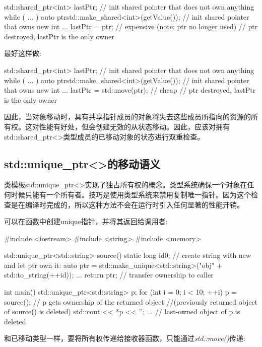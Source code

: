 \begin{cppcode}
std::shared_ptr<int> lastPtr; // init shared pointer that does not own anything
while ( ... ) {
	auto ptr{std::make_shared<int>(getValue())}; // init shared pointer that owns new int
	...
	lastPtr = ptr; // expensive (note: ptr no longer used)
} // ptr destroyed, lastPtr is the only owner
\end{cppcode}

最好这样做:

\begin{cppcode}
std::shared_ptr<int> lastPtr; // init shared pointer that does not own anything
while ( ... ) {
	auto ptr{std::make_shared<int>(getValue())}; // init shared pointer that owns new int
	...
	lastPtr = std::move(ptr); // cheap
} // ptr destroyed, lastPtr is the only owner
\end{cppcode}

因此，当对象移动时，具有共享指针成员的对象将失去这些成员所指向的资源的所有权。这对性能有好处，但会创建无效的从状态移动。因此，应该对拥有std::shared_ptr<>类型成员的已移动对象的状态进行双重检查。

\subsection{std::unique_ptr<>的移动语义}

类模板std::unique_ptr<>实现了独占所有权的概念。类型系统确保一个对象在任何时候只能有一个所有者。技巧是使用类型系统来禁用复制唯一指针。因为这个检查是在编译时完成的，所以这种方法不会在运行时引入任何显著的性能开销。

可以在函数中创建unique指针，并将其返回给调用者:

\begin{cppcode}
#include <iostream>
#include <string>
#include <memory>

std::unique_ptr<std::string> source()
{
	static long id{0};
	// create string with new and let ptr own it:
	auto ptr = std::make_unique<std::string>("obj" + std::to_string(++id));
	...
	return ptr; // transfer ownership to caller
}

int main()
{
	std::unique_ptr<std::string> p;
	for (int i = 0; i < 10; ++i) {
		p = source(); // p gets ownership of the returned object
		              //(previously returned object of source() is deleted)
		std::cout << *p << '\n';
		...
	}
} // last-owned object of p is deleted
\end{cppcode}

和已移动类型一样，要将所有权传递给接收器函数，只能通过\textit{std::move()}传递:

